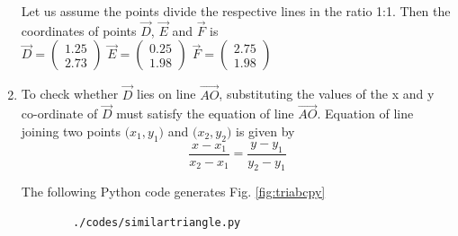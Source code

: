 \begin{enumerate}
Let us assume the points divide the respective lines in the ratio 1:1. Then the coordinates of points $\vec{D}$, $\vec{E}$ and $\vec{F}$ is \\
 \quad $ \vec{D}= \begin{pmatrix}1.25\\2.73\end{pmatrix}$
    \quad $\vec{E}=\begin{pmatrix}0.25\\1.98\end{pmatrix}$
    \quad $\vec{F}=\begin{pmatrix}2.75\\1.98\end{pmatrix}$\\
    
    
\item To check whether $\vec{D}$ lies on line $\vec{AO}$, substituting the values of the x and y co-ordinate of $\vec{D}$ must satisfy the equation of line $\vec{AO}$. Equation of line joining two points 
$\big(x_1,y_1\big)$ and $\big(x_2,y_2\big)$ is given by \begin{equation} \frac{x-x_1}{x_2-x_1} = \frac{y-y_1}{y_2-y_1}  \end{equation}
%  
  

    The  following Python code generates Fig. \ref{fig:triabcpy}\\
    \begin{lstlisting}
        ./codes/similartriangle.py
    \end{lstlisting}


\end{enumerate}
